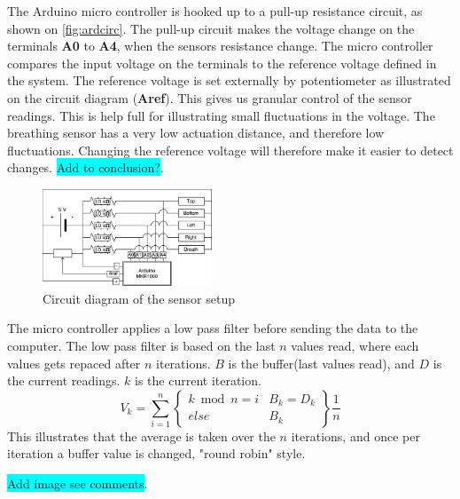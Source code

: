 \documentclass{sigchi-ext}
\begin{document}
The Arduino micro controller is hooked up to a pull-up resistance circuit, as shown on \autoref{fig:ardcirc}. The pull-up circuit makes the voltage change on the terminals \textbf{A0} to \textbf{A4}, when the sensors resistance change. 
The micro controller compares the input voltage on the terminals to the reference voltage defined in the system. The reference voltage is set externally by potentiometer as illustrated on the circuit diagram (\textbf{Aref}). This gives us granular control of the sensor readings. This is help full for illustrating small fluctuations in the voltage. The breathing sensor has a very low actuation distance, and therefore low fluctuations. Changing the reference voltage will therefore make it easier to detect changes.  
\colorbox{cyan}{Add to conclusion?}.

\begin{figure} [H]
   \centering \includegraphics[width=0.45\textwidth]{img/arduino_diagram}
    \caption{Circuit diagram of the sensor setup}
    \label{fig:ardcirc}
\end{figure}

The micro controller applies a low pass filter before sending the data to the computer. The low pass filter is based on the last $n$ values read, where each values gets repaced after $n$ iterations. $B$ is the buffer(last values read), and $D$ is the current readings. $k$ is the current iteration.
$$
V_k= \sum\limits_{i=1}^n 
\left\{
\begin{array}{ll}
    k \bmod n = i & B_k = D_k\\
    else          & B_k
\end{array}\right\}\frac{1}{n}
$$
This illustrates that the average is taken over the $n$ iterations, and once per iteration a buffer value is changed, "round robin" style.


\colorbox{cyan}{Add image see comments}.
%
%
\end{document}

